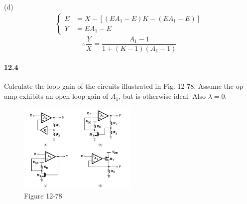 \documentclass[hyperref, UTF8]{ctexart}
\begin{document}
    (d)
    \begin{gather*} \left\{ \begin{aligned}
        E & = X - [(EA_1 - E)K - (EA_1 - E)] \\
        Y & = EA_1 - E
    \end{aligned} \right. \end{gather*}
    $$\therefore \frac{Y}{X} = \frac{A_1-1}{1+(K-1)(A_1-1)}$$
\paragraph{12.4} \label{12.4}
    Calculate the loop gain of the circuits illustrated in Fig. 12-78. Assume the op amp exhibits an open-loop gain of $A_1$, but is otherwise ideal. Also $\lambda = 0$.
    \begin{figure}[!htb]
        \centering
        \includegraphics[width=0.505\textwidth]{p12-78.png}
        \caption*{Figure 12-78}
    \end{figure}        
\end{document}
